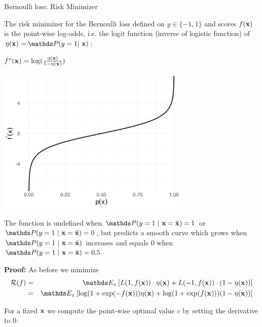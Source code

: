 \documentclass[11pt,compress,t,notes=noshow, xcolor=table]{beamer}
\begin{document}
\begin{vbframe}{Bernoulli loss: Risk Minimizer}
\begin{footnotesize}
\end{footnotesize}

\framebreak 

The risk minimizer for the Bernoulli loss defined on $y \in \{-1, 1\}$ and scores $f(\mathbf{x})$ is the point-wise log-odds, i.e. the logit function (inverse of logistic function) of $\eta(\xv) = \P(y=1|~\xv)$:

\begin{minipage}{0.3\textwidth} 
	\centering
	{$f^{\ast}(\mathbf{x}) =  \log (\frac{\eta(\mathbf{x}) }{1-\eta(\mathbf{x}) })$}
\end{minipage}
\hspace{-.03\textwidth}
\begin{minipage}{0.7\textwidth}
	\centering	
	\includegraphics[width=0.7\textwidth]{figure/logistic_inverse.png}
\end{minipage}

The function is undefined when $\P(y=1~|~\xv = \xtil) = 1$ or $\P(y=1~|~\xv = \xtil) = 0$, but predicts a smooth curve which grows when $\P(y=1~|~\xv = \xtil)$ increases and equals $0$ when $\P(y=1~|~\xv = \xtil) = 0.5$

\framebreak 

\textbf{Proof: } As before we minimize 
\begin{eqnarray*}
  \riskf &=& \E_x \left[L(1, \fx) \cdot \eta(\xv) + L(-1, \fx) \cdot (1 - \eta(\xv)) \right] \\
  &=& \E_x \left[ \log(1 + \exp(- \fx)) \eta(\xv)+ \log(1 + \exp(\fx)) (1 - \eta(\xv)) \right] 
\end{eqnarray*}

For a fixed $\mathbf{x}$ we compute the point-wise optimal value $c$ by setting the derivative to $0$: 


\end{vbframe}
\end{document}
